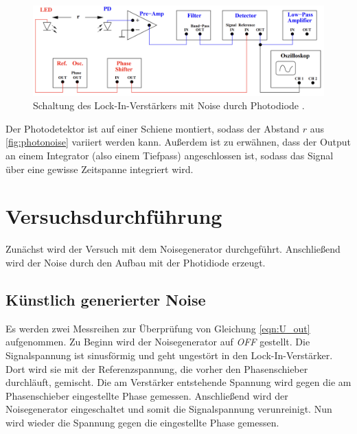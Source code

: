 \begin{figure}[H]
    \includegraphics[width=\textwidth]{./content/Schaltung_Photodiode.png}
    \caption{Schaltung des Lock-In-Verstärkers mit Noise durch Photodiode \cite{Versuchsanleitung_v303}.}
    \label{fig:photonoise}
\end{figure}

\noindent
Der Photodetektor ist auf einer Schiene montiert, sodass der Abstand $r$ aus \autoref{fig:photonoise} variiert werden kann.
Außerdem ist zu erwähnen, dass der Output an einem Integrator (also einem Tiefpass) angeschlossen ist, sodass das Signal über eine 
gewisse Zeitspanne integriert wird.


\section{Versuchsdurchführung}
Zunächst wird der Versuch mit dem Noisegenerator durchgeführt. Anschließend wird der Noise durch den Aufbau mit der Photidiode erzeugt.

\subsection{Künstlich generierter Noise}
\label{sec:durchf_kunst}
Es werden zwei Messreihen zur Überprüfung von Gleichung \eqref{eqn:U_out} aufgenommen. Zu Beginn wird der Noisegenerator auf \emph{OFF} gestellt.
Die Signalspannung ist sinusförmig und geht ungestört in den Lock-In-Verstärker. Dort wird sie mit der Referenzspannung, die vorher den 
Phasenschieber durchläuft, gemischt. Die am Verstärker entstehende Spannung wird gegen die am Phasenschieber eingestellte Phase gemessen.
Anschließend wird der Noisegenerator eingeschaltet und somit die Signalspannung verunreinigt. Nun wird wieder die Spannung gegen die eingestellte 
Phase gemessen.


